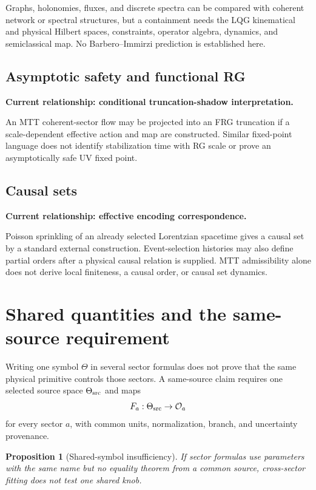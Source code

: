 \documentclass[11pt]{article}
\newtheorem{proposition}[theorem]{Proposition}
\begin{document}
Graphs, holonomies, fluxes, and discrete spectra can be compared with coherent
network or spectral structures, but a containment needs the LQG kinematical
and physical Hilbert spaces, constraints, operator algebra, dynamics, and
semiclassical map. No Barbero--Immirzi prediction is established here.

\subsection{Asymptotic safety and functional RG}

\textbf{Current relationship: conditional truncation-shadow interpretation.}

An MTT coherent-sector flow may be projected into an FRG truncation if a
scale-dependent effective action and map are constructed. Similar fixed-point
language does not identify stabilization time with RG scale or prove an
asymptotically safe UV fixed point.

\subsection{Causal sets}

\textbf{Current relationship: effective encoding correspondence.}

Poisson sprinkling of an already selected Lorentzian spacetime gives a causal
set by a standard external construction. Event-selection histories may also
define partial orders after a physical causal relation is supplied. MTT
admissibility alone does not derive local finiteness, a causal order, or causal
set dynamics.

\section{Shared quantities and the same-source requirement}

Writing one symbol $\Theta$ in several sector formulas does not prove that the
same physical primitive controls those sectors. A same-source claim requires
one selected source space $\Theta_{\rm src}$ and maps
\[
 F_a:\Theta_{\rm src}\to\mathcal O_a
\]
for every sector $a$, with common units, normalization, branch, and uncertainty
provenance.

\begin{proposition}[Shared-symbol insufficiency]
If sector formulas use parameters with the same name but no equality theorem
from a common source, cross-sector fitting does not test one shared knob.
\end{proposition}
\end{document}
